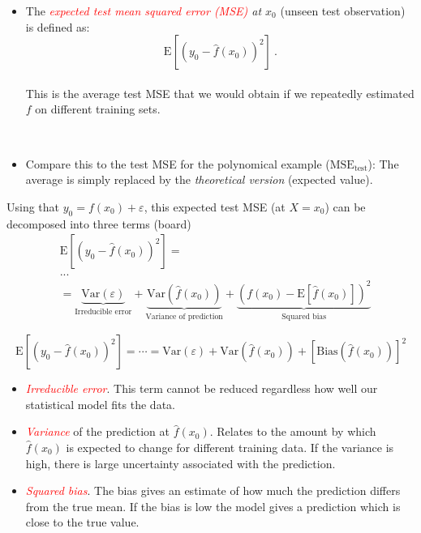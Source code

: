 \documentclass[
  ignorenonframetext,
]{beamer}
\providecommand{\tightlist}{%
  \setlength{\itemsep}{0pt}\setlength{\parskip}{0pt}}
\begin{document}
\begin{frame}
\begin{itemize}
\tightlist
\item
  The \emph{\textcolor{red}{expected test mean squared error (MSE)} at
  \(x_0\)} (unseen test observation) is defined as:
  \[\text{E}[(y_0 - \hat{f}(x_0))^2] \ .\]\\
  This is the average test MSE that we would obtain if we repeatedly
  estimated \(f\) on different training sets.
\end{itemize}

\(~\)

\begin{itemize}
\tightlist
\item
  Compare this to the test MSE for the polynomical example
  (\(\text{MSE}_{\text{test}}\)): The average is simply replaced by the
  \emph{theoretical version} (expected value).
\end{itemize}
\end{frame}

\begin{frame}
Using that \(y_0=f(x_0)+\varepsilon\), this expected test MSE (at
\(X=x_0\)) can be decomposed into three terms (board) \begin{align*}
&\text{E}[(y_0 - \hat{f}(x_0))^2] = \\
& ... \\
& =  \underbrace{\text{Var}(\varepsilon)}_{\text{Irreducible error}} + \underbrace{\text{Var}(\hat{f}(x_0))}_{\text{Variance of prediction}} + \underbrace{\left( f(x_0) - \text{E}[\hat{f}(x_0)] \right)^2}_{\text{Squared bias}}
\end{align*}
\end{frame}

\begin{frame}
\[\text{E}[(y_0 - \hat{f}(x_0))^2]=\cdots=\text{Var}(\varepsilon) +  \text{Var}(\hat{f}(x_0))+[\text{Bias}(\hat{f}(x_0))]^2\]

\begin{itemize}
\item
  \emph{\textcolor{red}{Irreducible error}}. This term cannot be reduced
  regardless how well our statistical model fits the data.
\item
  \emph{\textcolor{red}{Variance}} of the prediction at
  \(\hat{f}(x_0)\). Relates to the amount by which \(\hat{f}(x_0)\) is
  expected to change for different training data. If the variance is
  high, there is large uncertainty associated with the prediction.
\item
  \emph{\textcolor{red}{Squared bias}}. The bias gives an estimate of
  how much the prediction differs from the true mean. If the bias is low
  the model gives a prediction which is close to the true value.
\end{itemize}
\end{frame}
\end{document}
